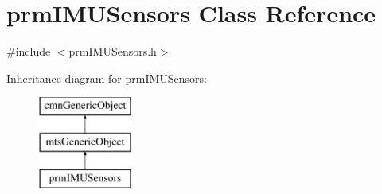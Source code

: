 \hypertarget{classprm_i_m_u_sensors}{\section{prm\-I\-M\-U\-Sensors Class Reference}
\label{classprm_i_m_u_sensors}
}


{\ttfamily \#include $<$prm\-I\-M\-U\-Sensors.\-h$>$}

Inheritance diagram for prm\-I\-M\-U\-Sensors\-:\begin{figure}[H]
\begin{center}
\leavevmode
\includegraphics[height=3.000000cm]{d8/d35/classprm_i_m_u_sensors}
\end{center}
\end{figure}

